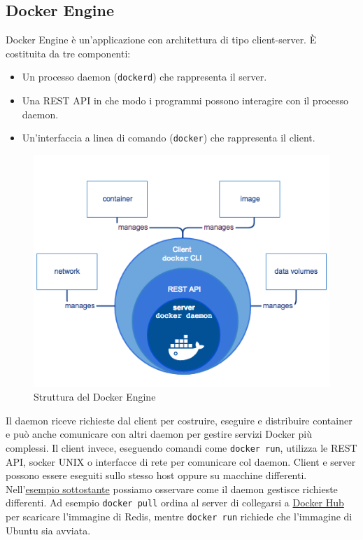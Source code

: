 \subsection{Docker Engine}
Docker Engine è un'applicazione con architettura di tipo client-server. È costituita da tre componenti:
\begin{itemize}
    \item Un processo daemon (\verb|dockerd|) che rappresenta il server.
    \item Una REST API in che modo i programmi possono interagire con il processo daemon.
    \item Un'interfaccia a linea di comando (\verb|docker|) che rappresenta il client.
\end{itemize}

\begin{figure}[h]
    \centering
    \includegraphics[scale=0.5]{immagini/engine-components-flow.png}
    \caption{Struttura del Docker Engine}
    \label{fig:docker-engine}
\end{figure}

Il daemon riceve richieste dal client per costruire, eseguire e distribuire container e può anche comunicare con altri daemon per gestire servizi Docker più complessi. Il client invece, eseguendo comandi come \verb|docker run|, utilizza le REST API, socker UNIX o interfacce di rete per comunicare col daemon. Client e server possono essere eseguiti sullo stesso host oppure su macchine differenti. Nell'\hyperref[fig:docker-architecture-example]{esempio sottostante} possiamo osservare come il daemon gestisce richieste differenti. Ad esempio \verb|docker pull| ordina al server di collegarsi a \hyperref[docker-hub]{Docker Hub} per scaricare l'immagine di Redis, mentre \verb|docker run| richiede che l'immagine di Ubuntu sia avviata.

